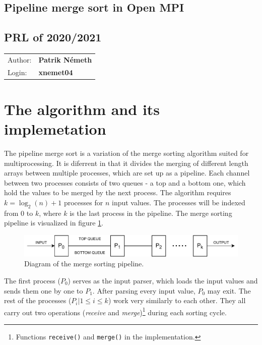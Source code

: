 \documentclass[pdftex, 11pt, a4paper, titlepage]{article}
\begin{document}
    \begin{center}
        \section*{Pipeline merge sort in Open MPI}
        \subsection*{PRL of 2020/2021}
        \begin{tabular}{ l l }
            Author: & \textbf{Patrik Németh} \\
            Login: & \textbf{xnemet04}
        \end{tabular}
    \end{center}
    \section{The algorithm and its implemetation}
        The pipeline merge sort is a variation of the merge sorting algorithm suited for multiprocessing.
        It is diferrent in that it divides the merging of different length arrays between multiple processes,
        which are set up as a pipeline. Each channel between two processes consists of two queues - a top and a bottom
        one, which hold the values to be merged by the next process. The algorithm requires $k = \log_{2}(n)+1$ processes
        for $n$ input values. The processes will be indexed from $0$ to $k$, where $k$ is the last process in the pipeline.
        The merge sorting pipeline is visualized in figure \ref{pms_diagram}.

        \begin{figure}[h]
            \centering
            \includegraphics[scale=0.8]{pms_diagram.pdf}
            \caption{Diagram of the merge sorting pipeline.}
            \label{pms_diagram}
        \end{figure}

        The first process ($P_0$) serves as the input parser, which loads the input values and sends them one by
        one to $P_1$. After parsing every input value, $P_0$ may exit. The rest of the processes
        ($P_i | 1\leq{}i\leq{}k$) work very similarly to each other. They all carry out two operations (\emph{receive}
        and \emph{merge})\footnote{Functions \texttt{receive()} and \texttt{merge()} in the implementation.} during each
        sorting cycle.
\end{document}
